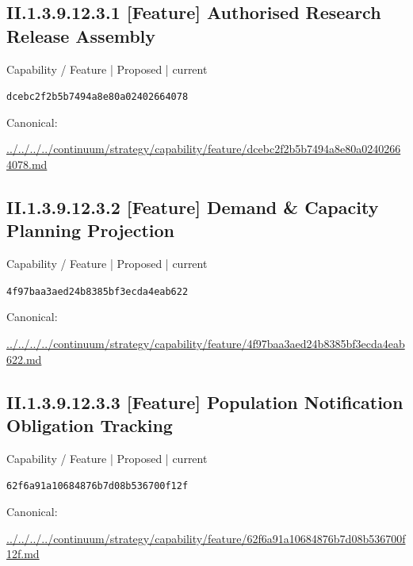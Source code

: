 \documentclass[10pt,a4paper]{article}
\begin{document}
\subsection*{II.1.3.9.12.3.1 [Feature] Authorised Research Release Assembly}
\label{element-dcebc2f2b5b7494a8e80a02402664078}
{\small Capability / Feature | Proposed | current}\par
\texttt{dcebc2f2b5b7494a8e80a02402664078}\par
Canonical: \par
{\footnotesize\url{../../../../continuum/strategy/capability/feature/dcebc2f2b5b7494a8e80a02402664078.md}}\par
\subsection*{II.1.3.9.12.3.2 [Feature] Demand \& Capacity Planning Projection}
\label{element-4f97baa3aed24b8385bf3ecda4eab622}
{\small Capability / Feature | Proposed | current}\par
\texttt{4f97baa3aed24b8385bf3ecda4eab622}\par
Canonical: \par
{\footnotesize\url{../../../../continuum/strategy/capability/feature/4f97baa3aed24b8385bf3ecda4eab622.md}}\par
\subsection*{II.1.3.9.12.3.3 [Feature] Population Notification Obligation Tracking}
\label{element-62f6a91a10684876b7d08b536700f12f}
{\small Capability / Feature | Proposed | current}\par
\texttt{62f6a91a10684876b7d08b536700f12f}\par
Canonical: \par
{\footnotesize\url{../../../../continuum/strategy/capability/feature/62f6a91a10684876b7d08b536700f12f.md}}\par
\end{document}
